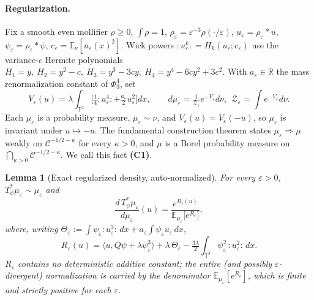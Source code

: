 \documentclass[12pt]{article}
\newcommand{\bR}{\mathbb{R}}
\newcommand{\bT}{\mathbb{T}}
\newcommand{\bE}{\mathbb{E}}
\newcommand{\Wick}[1]{{:}#1{:}}
\newcommand{\eps}{\varepsilon}
\newcommand{\kp}{\kappa}
\theoremstyle{plain}
\newtheorem{lemma}{Lemma}
\theoremstyle{definition}
\begin{document}
\paragraph{Regularization.}
Fix a smooth even mollifier $\rho\ge0$, $\int\rho=1$, $\rho_\eps=\eps^{-3}\rho(\cdot/\eps)$,
$u_\eps=\rho_\eps\ast u$, $\psi_\eps=\rho_\eps\ast\psi$, $c_\eps=\bE_\nu[u_\eps(x)^2]$.
Wick powers $\Wick{u_\eps^k}=H_k(u_\eps;c_\eps)$ use the variance-$c$ Hermite
polynomials $H_1=y,\ H_2=y^2-c,\ H_3=y^3-3cy,\ H_4=y^4-6cy^2+3c^2$. With $a_\eps\in\bR$
the mass renormalization constant of $\Phi^4_3$, set
\begin{equation}\label{eq:Veps}
V_\eps(u)=\lambda\!\int_{\bT^3}\!\Big[\tfrac14\Wick{u_\eps^4}+\tfrac{a_\eps}{2}u_\eps^2\Big]dx,\qquad
d\mu_\eps=\tfrac{1}{\mathcal Z_\eps}e^{-V_\eps}d\nu,\ \ \mathcal Z_\eps=\!\int e^{-V_\eps}d\nu.
\end{equation}
Each $\mu_\eps$ is a probability measure, $\mu_\eps\sim\nu$, and $V_\eps(u)=V_\eps(-u)$,
so $\mu_\eps$ is invariant under $u\mapsto-u$. The fundamental construction theorem
states $\mu_\eps\Rightarrow\mu$ weakly on $\mathcal{C}^{-1/2-\kp}$ for every $\kp>0$,
and $\mu$ is a Borel probability measure on $\bigcap_{\kp>0}\mathcal{C}^{-1/2-\kp}$.
We call this fact \textbf{(C1)}.

\begin{lemma}[Exact regularized density, auto-normalized]\label{lem:auto}
For every $\eps>0$, $T_\psi^\ast\mu_\eps\sim\mu_\eps$ and
\begin{equation}\label{eq:auto}
\frac{d\,T_\psi^\ast\mu_\eps}{d\mu_\eps}(u)=\frac{e^{R_\eps(u)}}{\bE_{\mu_\eps}\!\big[e^{R_\eps}\big]},
\end{equation}
where, writing $\Theta_\eps:=\int\psi_\eps\Wick{u_\eps^3}\,dx+a_\eps\!\int\psi_\eps u_\eps\,dx$,
\begin{equation}\label{eq:Reps}
R_\eps(u)=\langle u,Q\psi+\lambda\psi_\eps^3\rangle
+\lambda\,\Theta_\eps
-\tfrac{3\lambda}{2}\!\int_{\bT^3}\!\psi_\eps^2\,\Wick{u_\eps^2}\,dx .
\end{equation}
$R_\eps$ contains no deterministic additive constant; the entire (and possibly
$\eps$-divergent) normalization is carried by the denominator $\bE_{\mu_\eps}[e^{R_\eps}]$,
which is finite and strictly positive for each $\eps$.
\end{lemma}
\end{document}
